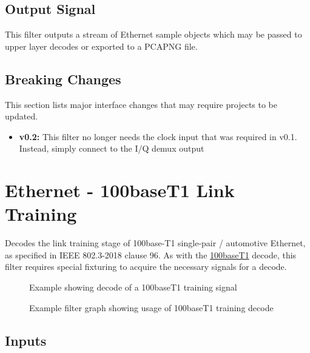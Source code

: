 \subsection{Output Signal}

This filter outputs a stream of Ethernet sample objects which may be passed to upper layer decodes or exported to a
PCAPNG file.

\subsection{Breaking Changes}

This section lists major interface changes that may require projects to be updated.

\begin{itemize}
\item \textbf{v0.2:} This filter no longer needs the clock input that was required in v0.1.
Instead, simply connect to the I/Q demux output
\end{itemize}

\pagebreak
\section{Ethernet - 100baseT1 Link Training}
\label{filter:100baset1-training}

Decodes the link training stage of 100base-T1 single-pair / automotive Ethernet, as specified in IEEE
802.3-2018 clause 96. As with the \hyperref[filter:100baset1]{100baseT1} decode, this filter requires special fixturing
to acquire the necessary signals for a decode.

\begin{figure}[h]
\centering
{}
\caption{Example showing decode of a 100baseT1 training signal}
\label{filter_100baset1_training}
\end{figure}

\begin{figure}[h]
\centering
{}
\caption{Example filter graph showing usage of 100baseT1 training decode}
\label{filter_graph_100baset1_training}
\end{figure}

\FloatBarrier
\subsection{Inputs}

